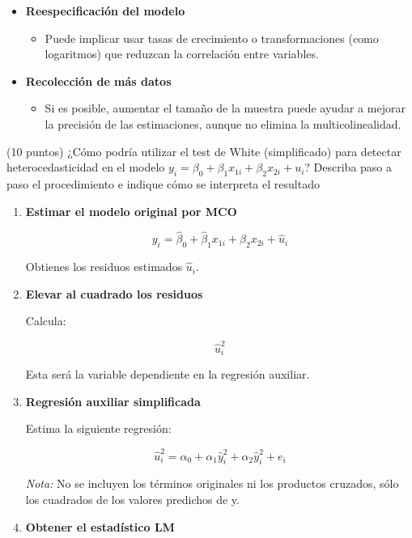 \documentclass[10pt,a4paper]{article}
\begin{document}
\begin{enumerate}
{\begin{itemize}
    \item \textbf{Reespecificación del modelo}
    \begin{itemize}
        \item Puede implicar usar tasas de crecimiento o transformaciones (como logaritmos) que reduzcan la correlación entre variables.
    \end{itemize}

    \item \textbf{Recolección de más datos}
    \begin{itemize}
        \item Si es posible, aumentar el tamaño de la muestra puede ayudar a mejorar la precisión de las estimaciones, aunque no elimina la multicolinealidad.
    \end{itemize}
\end{itemize}
{\color{black}
\item (10 puntos)
¿Cómo podría utilizar el test de White (simplificado) para detectar heterocedasticidad en el modelo \( y_i = \beta_0 + \beta_1 x_{1i} + \beta_2 x_{2i} + u_i \)? Describa paso a paso el procedimiento e indique cómo se interpreta el resultado

{\color{blue}
\begin{enumerate}
    \item \textbf{Estimar el modelo original por MCO}

    \[
    y_i = \hat{\beta}_0 + \hat{\beta}_1 x_{1i} + \hat{\beta}_2 x_{2i} + \hat{u}_i
    \]

    Obtienes los residuos estimados \( \hat{u}_i \).

    \item \textbf{Elevar al cuadrado los residuos}

    Calcula:

    \[
    \hat{u}_i^2
    \]

    Esta será la variable dependiente en la regresión auxiliar.

    \item \textbf{Regresión auxiliar simplificada}

    Estima la siguiente regresión:

    \[
    \hat{u}_i^2 = \alpha_0 + \alpha_1 \hat{y}_{i}^2 + \alpha_2 \hat{y}^2_{i} + e_i
    \]

    \textit{Nota:} No se incluyen los términos originales ni los productos cruzados, sólo los cuadrados de los valores predichos de y.

    \item \textbf{Obtener el estadístico LM}


\end{enumerate}}}}
\end{enumerate}
\end{document}
